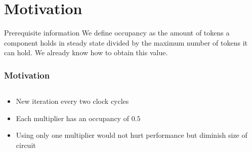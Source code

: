 \documentclass{beamer}
\begin{document}
\section{Motivation}
\begin{frame}{Prerequisite information}
    We define occupancy as the amount of tokens a component holds in steady state divided by the maximum number of tokens it can hold. We already know how to obtain this value.\footnotemark
    
\end{frame}
\begin{frame}[fragile]
\frametitle{Motivation}
\begin{columns}[T]
    \begin{column}{0.45\textwidth}
      \begin{itemize}
          \item New iteration every two clock cycles
          \item Each multiplier has an occupancy of $0.5$
          \item Using only one multiplier would not hurt performance but diminish size of circuit
      \end{itemize}
    \end{column}
    \begin{column}{0.45\textwidth}
        \begin{center}

\end{center}
\end{column}
\end{columns}
\end{frame}
\end{document}
